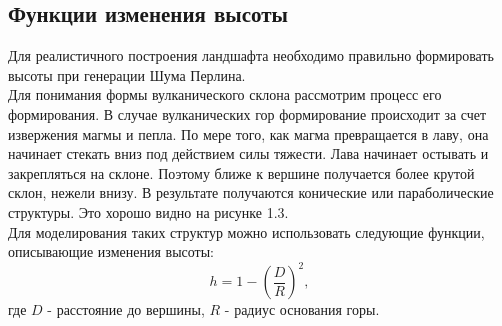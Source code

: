 

\subsection{Функции изменения высоты}
Для реалистичного построения ландшафта необходимо правильно формировать высоты 
при генерации Шума Перлина. \\
Для понимания формы вулканического склона рассмотрим процесс его формирования. 
В случае вулканических гор формирование происходит за счет извержения магмы и пепла. По мере того, как магма превращается в лаву, она начинает стекать вниз под действием силы тяжести. Лава начинает остывать и закрепляться на склоне. Поэтому ближе к вершине получается более крутой склон, нежели  внизу. В результате получаются конические или параболические структуры. Это хорошо видно на рисунке 1.3. \\
Для моделирования таких структур можно использовать следующие функции, описывающие изменения высоты:
\[
h = 1 - (\frac{D}{R})^2,
\] где $D$ - расстояние до вершины, $R$ - радиус основания горы.



